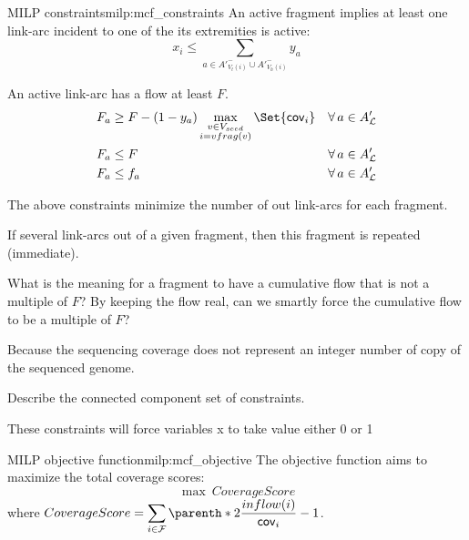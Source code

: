 \begin{definition}{\MCF{} MILP constraints}{milp:mcf_constraints}
    An active fragment implies at least one link-arc incident to one of the its extremities is active:
    \begin{equation}
        x_i \leq \sum_{a \in A'^-_{V_t(i)} \cup A'^-_{V_h(i)}} y_a
    \end{equation}

    An active link-arc has a flow at least \(F\).
    \begin{align}
        F_a & \geq F - (1 - y_a) \max_{\substack{v \in \VSeed{} \\ i = vfrag(v)}}\Set{\cov{i}} & \forall a \in A'_\Links{} \\
        F_a & \leq F & \forall a \in A'_\Links{} \\
        F_a & \leq f_a & \forall a \in A'_\Links{} \label{const:arc_flow_at_least_total_flow}
    \end{align}
    \begin{infobox}
        The above constraints minimize the number of out link-arcs for each fragment.
    \end{infobox}
    \begin{missingproofbox}
        If several link-arcs out of a given fragment,
        then this fragment is repeated (immediate).
    \end{missingproofbox}
    \begin{questionbox}
        What is the meaning for a fragment to have a cumulative flow that is not a multiple of \(F\)?
        By keeping the flow real, can we smartly force the cumulative flow to be a multiple of \(F\)? 

        \begin{notebox}
            Because the sequencing coverage does not represent an integer number of copy of the sequenced genome.
        \end{notebox}
    \end{questionbox}

    \begin{todobox}
        Describe the connected component set of constraints.
        \begin{notebox}
            These constraints will force variables x to take value either 0 or 1
        \end{notebox}
    \end{todobox}
\end{definition}

\begin{definition}{\MCF{} MILP objective function}{milp:mcf_objective}
    The objective function aims to maximize the total coverage scores:
    \begin{equation}
        \max ~ CoverageScore
    \end{equation}
    where \(
        \displaystyle CoverageScore = %
            \sum_{i \in \Fragments{}} \parenth*{2 \frac{inflow(i)}{\cov{i}} - 1}
    \).
\end{definition}